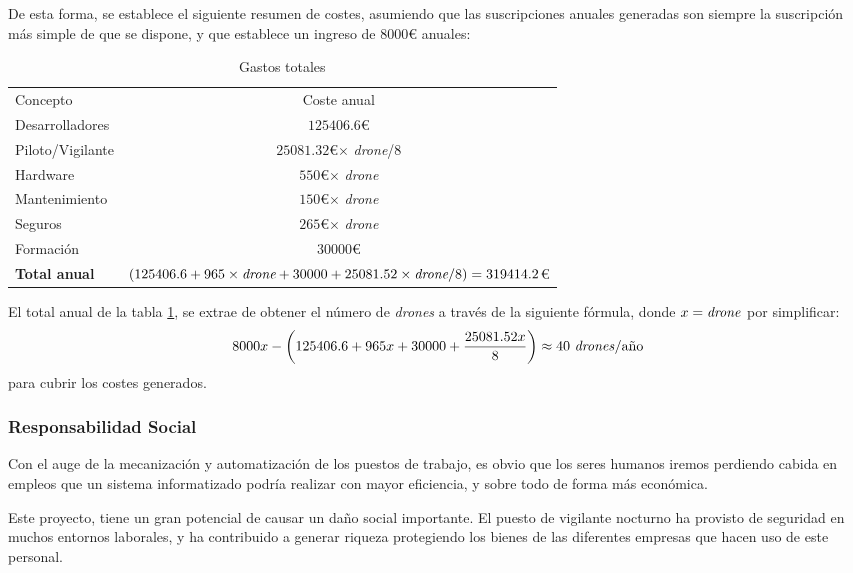 De esta forma, se establece el siguiente resumen de costes, asumiendo que las suscripciones anuales generadas son siempre la suscripción más simple de que se dispone, y que establece un ingreso de $8000$\euro{} anuales: 

\begin{table}[H]
	\begin{center}
		\begin{tabular}{l  c}\hline
			\toprule
			Concepto & Coste anual\\
			\otoprule
			Desarrolladores & $125406.6$\euro\\
			Piloto/Vigilante & $25081.32$\euro $\times$ \emph{drone}/8 \\ 
			Hardware   & $550$\euro $\times$ \emph{drone}\\
			Mantenimiento & $150$\euro $\times$ \emph{drone}\\
			Seguros & $265$\euro $\times$ \emph{drone}\\
			Formación & $30000$\euro \\
			\hline
			\textbf{Total anual} & $(125406.6 + 965 \times \emph{drone} + 30000 + 25081.52 \times \emph{drone}/8) = 319414.2$\euro\\
			\bottomrule
		\end{tabular}
		\caption{Gastos totales}
		\label{tb:gastosTotalesEq}
	\end{center}
\end{table}

El total anual de la tabla \ref{tb:gastosTotalesEq}, se extrae de obtener el número de \emph{drones} a través de la siguiente fórmula, donde $x=\text{\emph{drone}}$ por simplificar: 
\begin{equation}
8000x - \left(125406.6 + 965x + 30000 + \frac{25081.52x}{8}\right) \approx 40 \text{ \emph{drones}/año}
\end{equation}
 para cubrir los costes generados.


\subsubsection{Responsabilidad Social}
\label{subsec:respSocial}
Con el auge de la mecanización y automatización de los puestos de trabajo, es obvio que los seres humanos iremos perdiendo cabida en empleos que un sistema informatizado podría realizar con mayor eficiencia, y sobre todo de forma más económica. 

Este proyecto, tiene un gran potencial de causar un daño social importante. El puesto de vigilante nocturno ha provisto de seguridad en muchos entornos laborales, y ha contribuido a generar riqueza protegiendo los bienes de las diferentes empresas que hacen uso de este personal.


